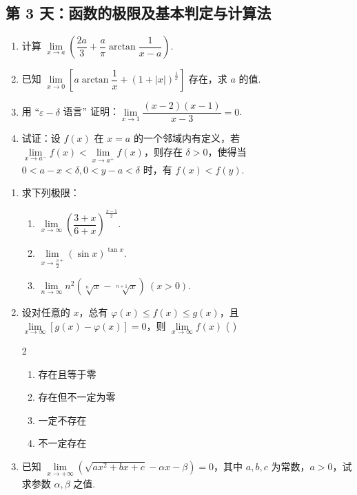 \newpage
\subsection*{第 3 天：函数的极限及基本判定与计算法}
\vspace{1cm}

\begin{enumerate}[label=\textbf{\arabic*.}, itemsep=4.5cm]
    \item 计算 $\lim\limits_{x \to a} \left( \dfrac{2a}{3} + \dfrac{a}{\pi} \arctan \dfrac{1}{x-a} \right)$.

    \item 已知 $\lim\limits_{x \to 0} \left[ a \arctan \dfrac{1}{x} + (1+|x|)^{\frac{1}{x}} \right]$ 存在，求 $a$ 的值.

    \item 用 “$\varepsilon - \delta$ 语言” 证明：$\lim\limits_{x \to 1} \dfrac{(x-2)(x-1)}{x-3} = 0$.

    \item 试证：设 $f(x)$ 在 $x=a$ 的一个邻域内有定义，若 $\lim\limits_{x \to a^-} f(x) < \lim\limits_{x \to a^+} f(x)$，则存在 $\delta > 0$，使得当 $0 < a-x < \delta, 0 < y-a < \delta$ 时，有 $f(x) < f(y)$.
\end{enumerate}

\newpage

\begin{enumerate}[label=\textbf{\arabic*.}, itemsep=4.5cm, resume]
    \item 求下列极限：
    \begin{enumerate}[label=(\arabic*), itemsep=3cm]
        \item $\lim\limits_{x \to \infty} \left( \dfrac{3+x}{6+x} \right)^{\frac{x-1}{2}}$.
        \item $\lim\limits_{x \to \frac{\pi}{2}^+} (\sin x)^{\tan x}$.
        \item $\lim\limits_{n \to \infty} n^2 (\sqrt[n]{x} - \sqrt[n+1]{x}) \ (x > 0)$.
    \end{enumerate}

    \item 设对任意的 $x$，总有 $\varphi(x) \le f(x) \le g(x)$，且 $\lim\limits_{x \to \infty} [g(x) - \varphi(x)] = 0$，则 $\lim\limits_{x \to \infty} f(x)$ ( \quad )
    \begin{multicols}{2}
    \begin{enumerate}[label=(\Alph*)]
        \item 存在且等于零
        \item 存在但不一定为零
        \item 一定不存在
        \item 不一定存在
    \end{enumerate}
    \end{multicols}

    \item 已知 $\lim\limits_{x \to +\infty} (\sqrt{ax^2+bx+c} - \alpha x - \beta) = 0$，其中 $a,b,c$ 为常数，$a>0$，试求参数 $\alpha, \beta$ 之值.
\end{enumerate}

